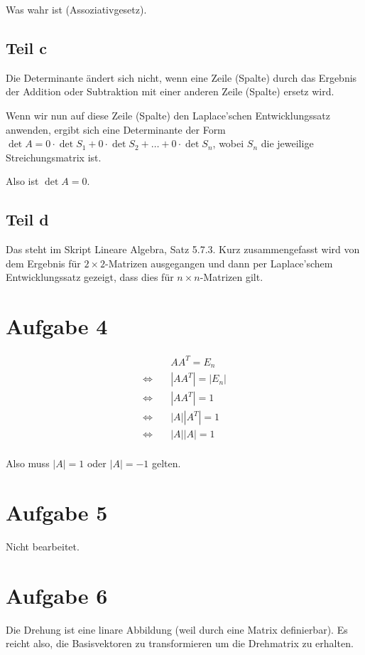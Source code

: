 \documentclass[a4paper,german,12pt,smallheadings]{scrartcl}
\begin{document}
Was wahr ist (Assoziativgesetz).

\subsection*{Teil c}
Die Determinante ändert sich nicht, wenn eine Zeile (Spalte) durch das Ergebnis
der Addition oder Subtraktion mit einer anderen Zeile (Spalte) ersetz wird.

Wenn wir nun auf diese Zeile (Spalte) den Laplace'schen Entwicklungssatz
anwenden, ergibt sich eine Determinante der Form $\det A = 0 \cdot \det S_1 + 0
\cdot \det S_2 + \dots + 0 \cdot \det S_n$, wobei $S_n$ die jeweilige
Streichungsmatrix ist.

Also ist $\det A = 0$.

\subsection*{Teil d}

Das steht im Skript Lineare Algebra, Satz 5.7.3. Kurz zusammengefasst wird von
dem Ergebnis für $2\times2$-Matrizen ausgegangen und dann per Laplace'schem
Entwicklungssatz gezeigt, dass dies für $n\times n$-Matrizen gilt.

\section*{Aufgabe 4}
\begin{align*}
  &AA^T = E_n\\
  \Leftrightarrow\quad&|AA^T| = |E_n| \\
  \Leftrightarrow\quad&|AA^T| = 1 \\
  \Leftrightarrow\quad&|A||A^T| = 1 \\
  \Leftrightarrow\quad&|A||A| = 1 \\
\end{align*}

Also muss $|A| = 1$ oder $|A| = -1$ gelten.

\section*{Aufgabe 5}
Nicht bearbeitet.

\section*{Aufgabe 6}
Die Drehung ist eine linare Abbildung (weil durch eine Matrix definierbar). Es
reicht also, die Basisvektoren zu transformieren um die Drehmatrix zu erhalten.
\end{document}
